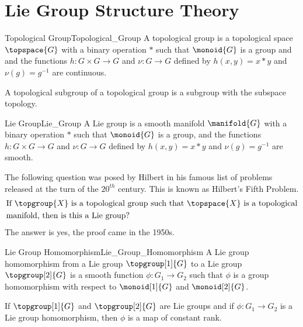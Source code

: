 \documentclass[oneside]{book}                                                  %
\begin{document}
    \chapter{Lie Group Structure Theory}
        \begin{fdefinition}{Topological Group}{Topological_Group}
            A topological group is a topological space $\topspace{G}$ with a
            binary operation $*$ such that $\monoid{G}$ is a group and and
            the functions $h:G\times{G}\rightarrow{G}$ and $\nu:G\rightarrow{G}$
            defined by $h(x,y)=x*y$ and $\nu(g)=g^{\minus{1}}$ are continuous.
        \end{fdefinition}
        A topological subgroup of a topological group is a subgroup with the
        subspace topology.
        \begin{fdefinition}{Lie Group}{Lie_Group}
            A Lie group is a smooth manifold $\manifold{G}$ with a binary
            operation $*$ such that $\monoid{G}$ is a group, and the functions
            $h:G\times{G}\rightarrow{G}$ and $\nu:G\rightarrow{G}$ defined by
            $h(x,y)=x*y$ and $\nu(g)=g^{\minus{1}}$ are smooth.
        \end{fdefinition}
        The following question was posed by Hilbert in his famous list of
        problems released at the turn of the $20^{th}$ century. This is known as
        Hilbert's Fifth Problem.
        \begin{equation}
            \begin{split}
                &\text{If }\topgroup{X}\text{ is a topological group such that }
                \topspace{X}\text{ is a topological}\\
                &\text{manifold, then is this a Lie group?}
            \end{split}
        \end{equation}
        The answer is yes, the proof came in the 1950s.
        \begin{fdefinition}{Lie Group Homomorphism}{Lie_Group_Homomorphism}
            A Lie group homomorphism from a Lie group
            $\topgroup[1]{G}$ to a Lie group $\topgroup[2]{G}$ is a smooth
            function $\phi:G_{1}\rightarrow{G}_{2}$ such that $\phi$ is a
            group homomorphism with respect to $\monoid[1]{G}$ and
            $\monoid[2]{G}$.
        \end{fdefinition}
        \begin{theorem}
            If $\topgroup[1]{G}$ and $\topgroup[2]{G}$ are Lie groups and if
            $\phi:G_{1}\rightarrow{G}_{2}$ is a Lie group homomorphism, then
            $\phi$ is a map of constant rank.
        \end{theorem}
\end{document}
